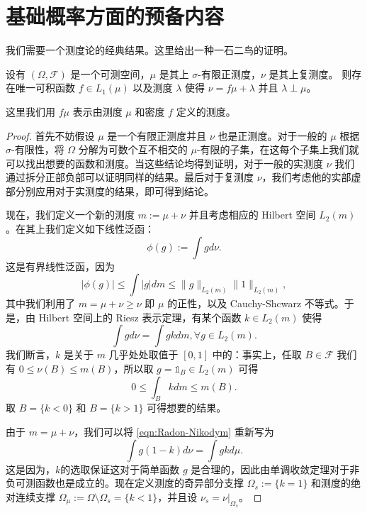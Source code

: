 \section{基础概率方面的预备内容}
    我们需要一个测度论的经典结果。这里给出一种一石二鸟的证明\cite{einsiedler2017functional}。
    \begin{theorem}
        设有 $(\Omega,\mathcal{F})$ 是一个可测空间，$\mu$ 是其上 $\sigma$-有限正测度，$\nu$ 是其上复测度。
        则存在唯一可积函数 $f\in L_1(\mu)$ 以及测度 $\lambda$ 使得 $\nu= f\mu+\lambda$ 并且 $\lambda\perp\mu$。
    \end{theorem}
    这里我们用 $f\mu$ 表示由测度 $\mu$ 和密度 $f$ 定义的测度。
\begin{proof}
    首先不妨假设 $\mu$ 是一个有限正测度并且 $\nu$ 也是正测度。对于一般的 $\mu$ 根据 $\sigma$-有限性，将 $\Omega$ 分解为可数个互不相交的 $\mu$-有限的子集，在这每个子集上我们就可以找出想要的函数和测度。当这些结论均得到证明，对于一般的实测度 $\nu$ 我们通过拆分正部负部可以证明同样的结果。最后对于复测度 $\nu$，我们考虑他的实部虚部分别应用对于实测度的结果，即可得到结论。
    \par 现在，我们定义一个新的测度 $m:=\mu+\nu$ 并且考虑相应的 Hilbert 空间 $L_2(m)$。在其上我们定义如下线性泛函：
        \[\phi(g):=\int gd\nu.\]
    这是有界线性泛函，因为
        \[|\phi(g)|\leq\int |g|dm\leq \|g\|_{L_2(m)}\|1\|_{L_2(m)},\]
    其中我们利用了 $m=\mu+\nu\geq\nu$ 即 $\mu$ 的正性，以及 Cauchy-Shcwarz 不等式。于是，由 Hilbert 空间上的 Riesz 表示定理\cite[Corollary~3.19]{einsiedler2017functional}，有某个函数 $k\in L_2(m)$ 使得
        \begin{equation}\label{eqn:Radon-Nikodym}
            \int gd\nu=\int gkd m,\forall g\in L_2(m).
        \end{equation}
    我们断言，$k$ 是关于 $m$ 几乎处处取值于 $[0,1]$ 中的：事实上，任取 $B\in\mathcal{F}$ 我们有 $0\leq\nu(B)\leq m(B)$，所以取 $g=\mathbb{1}_B\in L_2(m)$ 可得
        \[0\leq\int_{B}kdm\leq m(B).\]
    取 $B=\{k<0\}$ 和 $B=\{k>1\}$ 可得想要的结果。 
    \par 由于 $m=\mu+\nu$，我们可以将 \eqref{eqn:Radon-Nikodym} 重新写为
        \begin{equation}\label{eqn:rewrite}
            \int g(1-k)d\nu=\int gkd\mu.
        \end{equation}    
    这是因为，$k$的选取保证这对于简单函数 $g$ 是合理的，因此由单调收敛定理对于非负可测函数也是成立的。现在定义测度的奇异部分支撑 $\Omega_{s}:=\{k=1\}$ 和测度的绝对连续支撑 $\Omega_{\mu}:=\Omega\setminus\Omega_{s}=\{k<1\}$，并且设 $\nu_s=\left.\nu\right|_{\Omega_s}$。

\end{proof}
